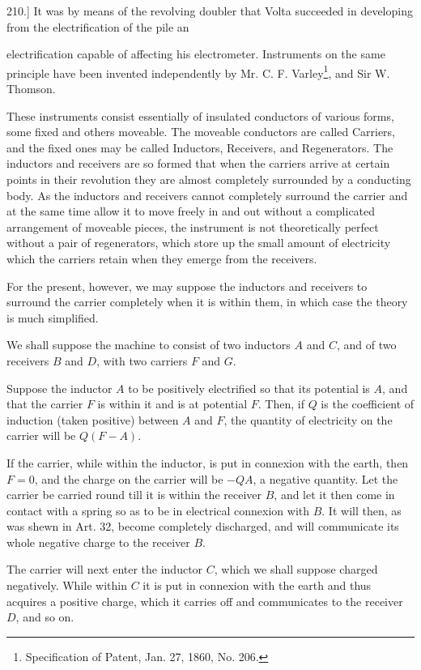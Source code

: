 \documentclass[11pt,a4paper]{article}
\begin{document}
210.] It was by means of the revolving doubler that Volta succeeded in
developing from the electrification of the pile an

electrification capable of affecting his electrometer. Instruments on
the same principle have been invented independently by Mr. C. F.
Varley\setcounter{footnote}{0}\footnote{Specification of Patent, Jan.
27, 1860, No. 206.}, and Sir W. Thomson.

These instruments consist essentially of insulated conductors of various
forms, some fixed and others moveable. The moveable conductors are called
Carriers, and the fixed ones may be called Inductors, Receivers, and
Regenerators. The inductors and receivers are so formed that when the
carriers arrive at certain points in their revolution they are almost
completely surrounded by a conducting body. As the inductors and
receivers cannot completely surround the carrier and at the same time
allow it to move freely in and out without a complicated arrangement of
moveable pieces, the instrument is not theoretically perfect without a
pair of regenerators, which store up the small amount of electricity
which the carriers retain when they emerge from the receivers.

For the present, however, we may suppose the inductors and receivers to
surround the carrier completely when it is within them, in which case the
theory is much simplified.

We shall suppose the machine to consist of two inductors $A$ and $C$, and
of two receivers $B$ and $D$, with two carriers $F$ and $G$.

Suppose the inductor $A$ to be positively electrified so that its
potential is $A$, and that the carrier $F$ is within it and is at
potential $F$. Then, if $Q$ is the coefficient of induction (taken
positive) between $A$ and $F$, the quantity of electricity on the carrier
will be $Q(F-A)$.

If the carrier, while within the inductor, is put in connexion with the
earth, then $F=0$, and the charge on the carrier will be $-QA$, a
negative quantity. Let the carrier be carried round till it is within the
receiver $B$, and let it then come in contact with a spring so as to be
in electrical connexion with $B$. It will then, as was shewn in Art. 32,
become completely discharged, and will communicate its whole negative
charge to the receiver $B$.

The carrier will next enter the inductor $C$, which we shall suppose
charged negatively. While within $C$ it is put in connexion with the
earth and thus acquires a positive charge, which it carries off and
communicates to the receiver $D$, and so on.
\end{document}

